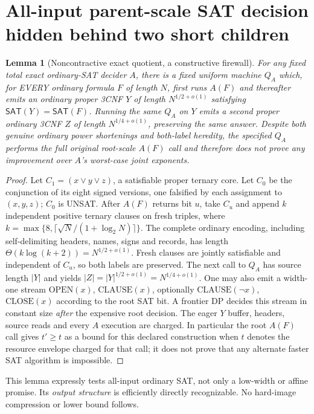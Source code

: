 \documentclass[11pt]{article}
\newtheorem{lemma}[theorem]{Lemma}
\newcommand{\SAT}{\mathsf{SAT}}
\begin{document}
\section{All-input parent-scale SAT decision hidden behind two short children}
\begin{lemma}[Noncontractive exact quotient, a constructive firewall]
For any fixed total exact ordinary-SAT decider $A$, there is a
fixed uniform machine $Q_A$ which, for EVERY ordinary formula $F$
of length $N$, first runs $A(F)$ and thereafter emits an ordinary
proper 3CNF $Y$ of length $N^{1/2+o(1)}$ satisfying
$\SAT(Y)=\SAT(F)$. Running the same $Q_A$ on $Y$
emits a second proper ordinary 3CNF $Z$ of length
$N^{1/4+o(1)}$, preserving the same answer.
Despite both genuine ordinary power shortenings and both-label
heredity, the specified $Q_A$ \emph{performs the full original
root-scale $A(F)$ call} and therefore does not prove any improvement
over $A$'s worst-case joint exponents.
\end{lemma}
\begin{proof}
Let $C_1=(x\lor y\lor z)$, a satisfiable proper ternary core.
Let $C_0$ be the conjunction of its eight signed versions, one
falsified by each assignment to $(x,y,z)$; $C_0$ is UNSAT.
After $A(F)$ returns bit $u$, take $C_u$ and append $k$
independent positive ternary clauses on fresh triples, where
$k=\max\{8,\lceil\sqrt{N}/(1+\log_2N)\rceil\}$.
The complete ordinary encoding, including self-delimiting
headers, names, signs and records, has length
$\Theta(k\log(k+2))=N^{1/2+o(1)}$.
Fresh clauses are jointly satisfiable and independent
of $C_u$, so both labels are preserved. The next call to
$Q_A$ has source length $|Y|$ and yields
$|Z|=|Y|^{1/2+o(1)}=N^{1/4+o(1)}$.
One may also emit a width-one stream
$\mathrm{OPEN}(x)$, $\mathrm{CLAUSE}(x)$,
optionally $\mathrm{CLAUSE}(\neg x)$, $\mathrm{CLOSE}(x)$
according to the root SAT bit. A frontier DP decides this
stream in constant size \emph{after} the expensive root
decision. The eager $Y$ buffer, headers, source reads and
every $A$ execution are charged. In particular the
root $A(F)$ call gives $t'\ge t$ as a bound for this
declared construction when $t$ denotes the resource
envelope charged for that call; it does not prove that
any alternate faster SAT algorithm is impossible.
\end{proof}
This lemma expressly tests all-input ordinary SAT, not
only a low-width or affine promise. Its \emph{output structure}
is efficiently directly recognizable. No hard-image
compression or lower bound follows.
\end{document}
